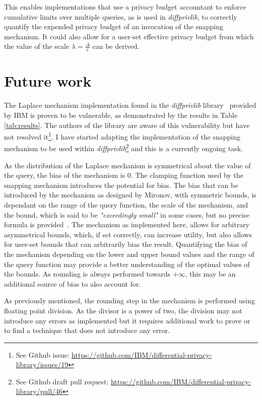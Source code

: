 \documentclass[orivec,envcountsame]{llncs}
\begin{document}
This enables implementations that use a privacy budget accountant to enforce cumulative limits over multiple queries, as is used in \textit{diffprivlib}, to correctly quantify the expended privacy budget of an invocation of the snapping mechanism. It could also allow for a user-set effective privacy budget from which the value of the scale $\lambda = \frac{\Delta}{\epsilon}$ can be derived.

\section{Future work}
The Laplace mechanism implementation found in the \textit{diffprivlib} library~\cite{diffprivlib} provided by IBM is proven to be vulnerable, as demonstrated by the results in Table \ref{tab:results}. The authors of the library are aware of this vulnerability but have not resolved it\footnote{See Github issue: \url{https://github.com/IBM/differential-privacy-library/issues/19}}. I have started adapting the implementation of the snapping mechanism to be used within \textit{diffprivlib}\footnote{See Github draft pull request: \url{https://github.com/IBM/differential-privacy-library/pull/46}} and this is a currently ongoing task.

As the distribution of the Laplace mechanism is symmetrical about the value of the query, the bias of the mechanism is 0. The clamping function used by the snapping mechanism introduces the potential for bias. The bias that can be introduced by the mechanism as designed by Mironov, with symmetric bounds, is dependant on the range of the query function, the scale of the mechanism, and the bound, which is said to be \textit{"exceedingly small"} in some cases, but no precise formula is provided~\cite{mironov2012significance}. The mechanism as implemented here, allows for arbitrary asymmetrical bounds, which, if set correctly, can increase utility, but also allows for user-set bounds that can arbitrarily bias the result. Quantifying the bias of the mechanism depending on the lower and upper bound values and the range of the query function may provide a better understanding of the optimal values of the bounds. As rounding is always performed towards $+\infty$, this may be an additional source of bias to also account for.

As previously mentioned, the rounding step in the mechanism is performed using floating point division. As the divisor is a power of two, the division may not introduce any errors as implemented but it requires additional work to prove or to find a technique that does not introduce any error.

\newpage


\end{document}
